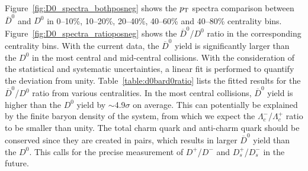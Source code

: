 \documentclass[%
 reprint,	
 amsmath,amssymb,
 aps,
 prc,
]{revtex4-1}
\begin{document}
Figure~\ref{fig:D0_spectra_bothposneg} shows the $p_{\rm T}$ spectra comparison between $\overline{D}^{0}$ and $D^0$ in 0--10\%, 10--20\%, 20--40\%, 40--60\% and 40--80\% centrality bins. Figure~\ref{fig:D0_spectra_ratioposneg} shows the $\overline{D}^{0}$/$D^{0}$ ratio in the corresponding centrality bins. With the current data, the $\overline{D}^{0}$ yield is significantly larger than the $D^{0}$ in the most central and mid-central collisions. With the consideration of the statistical and systematic uncertainties, a linear fit is performed to quantify the deviation from unity. Table~\ref{table:d0bard0ratio} lists the fitted results for the $\overline{D}^{0}$/$D^0$ ratio from various centralities. In the most central collisions, $\overline{D}^{0}$ yield is higher than the $D^0$ yield by $\sim$4.9$\sigma$ on average. This can potentially be explained by the finite baryon density of the system, from which we expect the $\Lambda_{c}^-$/$\Lambda_{c}^+$ ratio to be smaller than unity. The total charm quark and anti-charm quark should be conserved since they are created in pairs, which results in larger $\overline{D}^{0}$ yield than the $D^0$. This calls for the precise measurement of $D^{+}$/$D^{-}$ and $D_{s}^{+}$/$D_{s}^{-}$ in the future.

\begin{table}[t]
\end{table}
\end{document}
